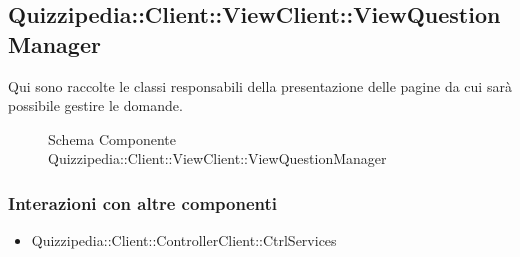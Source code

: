 \subsection{Quizzipedia::Client::ViewClient::ViewQuestionManager}
Qui sono raccolte le classi responsabili della presentazione delle pagine da cui sarà possibile gestire le domande.
\begin{figure}[H]
\centering
\noindent{}
\caption[Quizzipedia::Client::ViewClient::ViewQuestionManager]{Schema Componente Quizzipedia::Client::ViewClient::ViewQuestionManager}
\end{figure}
\subsubsection{Interazioni con altre componenti}
\begin{itemize}
\item Quizzipedia::Client::ControllerClient::CtrlServices
\end{itemize}

